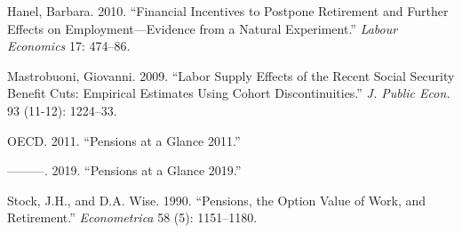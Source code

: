 \documentclass[]{article}
\begin{document}
\leavevmode\hypertarget{ref-hanel09}{}%
Hanel, Barbara. 2010. ``Financial Incentives to Postpone Retirement and
Further Effects on Employment---Evidence from a Natural Experiment.''
\emph{Labour Economics} 17: 474--86.

\leavevmode\hypertarget{ref-mastrobouni09}{}%
Mastrobuoni, Giovanni. 2009. ``Labor Supply Effects of the Recent Social
Security Benefit Cuts: Empirical Estimates Using Cohort
Discontinuities.'' \emph{J. Public Econ.} 93 (11-12): 1224--33.

\leavevmode\hypertarget{ref-ocde11}{}%
OECD. 2011. ``Pensions at a Glance 2011.''

\leavevmode\hypertarget{ref-ocde19}{}%
---------. 2019. ``Pensions at a Glance 2019.''

\leavevmode\hypertarget{ref-stock90}{}%
Stock, J.H., and D.A. Wise. 1990. ``Pensions, the Option Value of Work,
and Retirement.'' \emph{Econometrica} 58 (5): 1151--1180.
\end{document}
